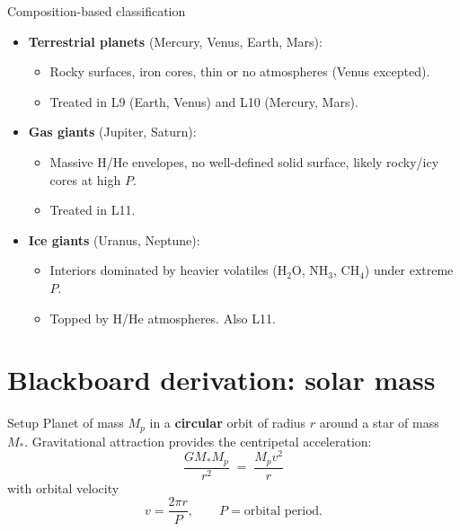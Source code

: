 \documentclass[aspectratio=169, 11pt]{beamer}
\begin{document}
\begin{frame}{Composition-based classification}
  \begin{itemize}
    \item \textbf{Terrestrial planets} (Mercury, Venus, Earth, Mars):
    \begin{itemize}
      \item Rocky surfaces, iron cores, thin or no atmospheres (Venus excepted).
      \item Treated in L9 (Earth, Venus) and L10 (Mercury, Mars).
    \end{itemize}
    \item \textbf{Gas giants} (Jupiter, Saturn):
    \begin{itemize}
      \item Massive H/He envelopes, no well-defined solid surface, likely rocky/icy cores at high $P$.
      \item Treated in L11.
    \end{itemize}
    \item \textbf{Ice giants} (Uranus, Neptune):
    \begin{itemize}
      \item Interiors dominated by heavier volatiles ($\mathrm{H_2O}$, $\mathrm{NH_3}$, $\mathrm{CH_4}$) under extreme $P$.
      \item Topped by H/He atmospheres. Also L11.
    \end{itemize}
  \end{itemize}
\end{frame}

\breakslide


\section{Blackboard derivation: solar mass}

\begin{frame}{Setup}
  Planet of mass $M_p$ in a \textbf{circular} orbit of radius $r$ around a star of mass $M_*$.
  \vskip6pt\relax
  Gravitational attraction provides the centripetal acceleration:
  \vskip4pt\relax
  \[
    \frac{G M_* M_p}{r^2} \;=\; \frac{M_p v^2}{r}
  \]
  \vskip4pt\relax
  with orbital velocity
  \[
    v = \frac{2 \pi r}{P}, \qquad P = \text{orbital period}.
  \]
\end{frame}
\end{document}
